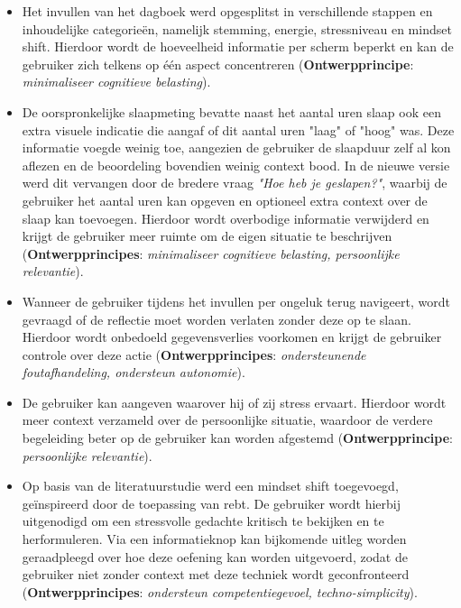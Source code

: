 \vspace{1em}

{\small
    \begin{itemize}
        \item Het invullen van het dagboek werd opgesplitst in verschillende stappen en inhoudelijke categorieën, namelijk stemming, energie, stressniveau en mindset shift. Hierdoor wordt de hoeveelheid informatie per scherm beperkt en kan de gebruiker zich telkens op één aspect concentreren (\textbf{Ontwerpprincipe}: \textit{minimaliseer cognitieve belasting}).
        
        \item De oorspronkelijke slaapmeting bevatte naast het aantal uren slaap ook een extra visuele indicatie die aangaf of dit aantal uren "laag" of "hoog" was. Deze informatie voegde weinig toe, aangezien de gebruiker de slaapduur zelf al kon aflezen en de beoordeling bovendien weinig context bood. In de nieuwe versie werd dit vervangen door de bredere vraag \textit{"Hoe heb je geslapen?"}, waarbij de gebruiker het aantal uren kan opgeven en optioneel extra context over de slaap kan toevoegen. Hierdoor wordt overbodige informatie verwijderd en krijgt de gebruiker meer ruimte om de eigen situatie te beschrijven (\textbf{Ontwerpprincipes}: \textit{minimaliseer cognitieve belasting, persoonlijke relevantie}).
        
        \item Wanneer de gebruiker tijdens het invullen per ongeluk terug navigeert, wordt gevraagd of de reflectie moet worden verlaten zonder deze op te slaan. Hierdoor wordt onbedoeld gegevensverlies voorkomen en krijgt de gebruiker controle over deze actie (\textbf{Ontwerpprincipes}: \textit{ondersteunende foutafhandeling, ondersteun autonomie}).
        
        \item De gebruiker kan aangeven waarover hij of zij stress ervaart. Hierdoor wordt meer context verzameld over de persoonlijke situatie, waardoor de verdere begeleiding beter op de gebruiker kan worden afgestemd (\textbf{Ontwerpprincipe}: \textit{persoonlijke relevantie}).
        
        \item Op basis van de literatuurstudie werd een mindset shift toegevoegd, geïnspireerd door de toepassing van \acrshort{rebt}. De gebruiker wordt hierbij uitgenodigd om een stressvolle gedachte kritisch te bekijken en te herformuleren. Via een informatieknop kan bijkomende uitleg worden geraadpleegd over hoe deze oefening kan worden uitgevoerd, zodat de gebruiker niet zonder context met deze techniek wordt geconfronteerd (\textbf{Ontwerpprincipes}: \textit{ondersteun competentiegevoel, techno-simplicity}).
        

\end{itemize}}
